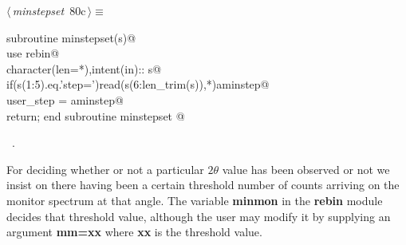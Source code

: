 \documentclass[10pt,a4paper,notitlepage]{article}
\newcommand{\var}[1]{\textbf{\textsf{#1}}} %
\newcommand{\code}[1]{\textbf{\textsf{#1}}} %
\newcommand{\mod}[1]{\textbf{\textsf{#1}}} %
\begin{document}
\begin{flushleft} \small
\begin{minipage}{\linewidth}\label{scrap92}\raggedright\small
{} $\langle\,${\it minstepset}\nobreak\ {\footnotesize {80c}}$\,\rangle\equiv$
\vspace{-1ex}
\begin{list}{}{} \item
\mbox{}\verb@      subroutine minstepset(s)@\\
\mbox{}\verb@      use rebin@\\
\mbox{}\verb@      character(len=*),intent(in):: s@\\
\mbox{}\verb@      if(s(1:5).eq.'step=')read(s(6:len_trim(s)),*)aminstep@\\
\mbox{}\verb@      user_step = aminstep@\\
\mbox{}\verb@      return; end subroutine minstepset                                    @{\NWsep}
\end{list}
\vspace{-1.5ex}
\footnotesize
\begin{list}{}{\setlength{\itemsep}{-\parsep}\setlength{\itemindent}{-\leftmargin}}
\item \NWtxtMacroRefIn\ .

\item{}
\end{list}
\end{minipage}\vspace{4ex}
\end{flushleft}
For deciding whether or not a particular $2\theta$ value has been observed
or not we insist on there having been a certain threshold number of counts
arriving on the monitor spectrum at that angle. 
The variable \var{minmon} in the \mod{rebin} module decides that threshold
value, although the user may modify it by supplying an argument \code{mm=xx}
where \code{xx} is the threshold value.
\end{document}
